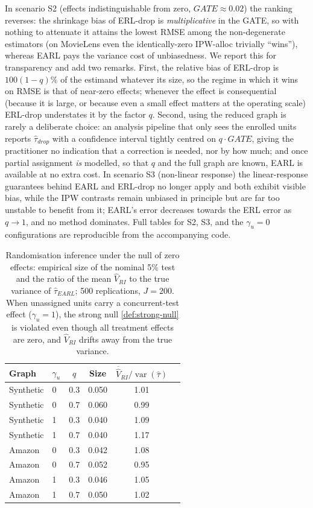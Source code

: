 \documentclass[sigconf]{acmart}
\DeclareMathOperator{\var}{var}
\begin{document}
In scenario S2 (effects indistinguishable from zero, $GATE\approx0.02$) the ranking reverses: the shrinkage bias of ERL-drop is \emph{multiplicative} in the GATE, so with nothing to attenuate it attains the lowest RMSE among the non-degenerate estimators (on MovieLens even the identically-zero IPW-alloc trivially ``wins''), whereas EARL pays the variance cost of unbiasedness. We report this for transparency and add two remarks. First, the relative bias of ERL-drop is $100(1-q)\%$ of the estimand whatever its size, so the regime in which it wins on RMSE is that of near-zero effects; whenever the effect is consequential (because it is large, or because even a small effect matters at the operating scale) ERL-drop understates it by the factor $q$. Second, using the reduced graph is rarely a deliberate choice: an analysis pipeline that only sees the enrolled units reports $\hat\tau_{drop}$ with a confidence interval tightly centred on $q\cdot GATE$, giving the practitioner no indication that a correction is needed, nor by how much; and once partial assignment \emph{is} modelled, so that $q$ and the full graph are known, EARL is available at no extra cost. In scenario S3 (non-linear response) the linear-response guarantees behind EARL and ERL-drop no longer apply and both exhibit visible bias, while the IPW contrasts remain unbiased in principle but are far too unstable to benefit from it; EARL's error decreases towards the ERL error as $q\to1$, and no method dominates. Full tables for S2, S3, and the $\gamma_u=0$ configurations are reproducible from the accompanying code.

\begin{table}
\caption{Randomisation inference under the null of zero effects: empirical size of the nominal 5\% test and the ratio of the mean $\hat V_{RI}$ to the true variance of $\hat\tau_{EARL}$; 500 replications, $J=200$. When unassigned units carry a concurrent-test effect ($\gamma_u=1$), the strong null \eqref{def:strong-null} is violated even though all treatment effects are zero, and $\hat V_{RI}$ drifts away from the true variance.}
\label{tab:ri}
\begin{tabular}{llcccc}
\toprule
Graph & $\gamma_u$ & $q$ & Size & $\overline{\hat V}_{RI}/\var(\hat\tau)$\\
\midrule
Synthetic & 0 & 0.3 & 0.050 & 1.01\\
Synthetic & 0 & 0.7 & 0.060 & 0.99\\
Synthetic & 1 & 0.3 & 0.040 & 1.09\\
Synthetic & 1 & 0.7 & 0.040 & 1.17\\
Amazon & 0 & 0.3 & 0.042 & 1.08\\
Amazon & 0 & 0.7 & 0.052 & 0.95\\
Amazon & 1 & 0.3 & 0.046 & 1.05\\
Amazon & 1 & 0.7 & 0.050 & 1.02\\
\bottomrule
\end{tabular}
\end{table}
\end{document}
